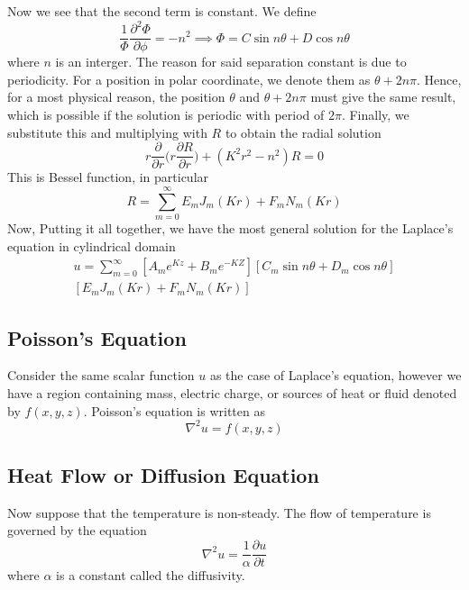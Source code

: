 \documentclass[../main.tex]{subfiles}
\begin{document}
Now we see that the second term is constant. We define 
\begin{equation*}
    \frac{1}{\Phi}\frac{\partial^2 \Phi}{\partial \phi}=-n^2\implies \Phi=C\sin n\theta +D\cos n\theta
\end{equation*}
where $n$ is an interger. The reason for said separation constant is due to periodicity. For a position in polar coordinate, we denote them as $\theta+2n\pi$. Hence, for a most physical reason, the position $\theta$ and $\theta+2n\pi$ must give the same result, which is possible if the solution is periodic with period of $2\pi$. Finally, we substitute this and multiplying with $R$ to obtain the radial solution
\begin{equation*}
    r\frac{\partial}{\partial r}\Biggl(r\frac{\partial R}{\partial r}\Biggr)
    +(K^2r^2-n^2)R=0
\end{equation*}
This is Bessel function, in particular
\begin{equation*}
    R=\sum_{m=0}^{\infty}E_mJ_m(Kr)+F_mN_m(Kr)
\end{equation*}
Now, Putting it all together, we have the most general solution for the Laplace's equation in cylindrical domain 
\begin{multline*}
    u=\sum_{m=0}^{\infty}\left[A_me^{Kz}+B_me^{-KZ}\right]\left[C_m\sin n\theta +D_m\cos n\theta\right]\\
    \left[E_mJ_m(Kr)+F_mN_m(Kr)\right]
\end{multline*}

\subsection*{Poisson’s Equation}
Consider the same scalar function $u$ as the case of Laplace's equation, however we have a region containing mass, electric charge, or sources of heat or fluid denoted by $f(x,y,z)$. Poisson's equation is written as 
\begin{equation*}
    \nabla^2 u=f(x,y,z)
\end{equation*}

\subsection*{Heat Flow or Diffusion Equation}
Now suppose that the temperature is non-steady. The flow of temperature is governed by the equation 
\begin{equation*}
    \nabla^2 u=\frac{1}{\alpha}\frac{\partial u}{\partial t}
\end{equation*}
where $\alpha$ is a constant called the diﬀusivity.
\end{document}
